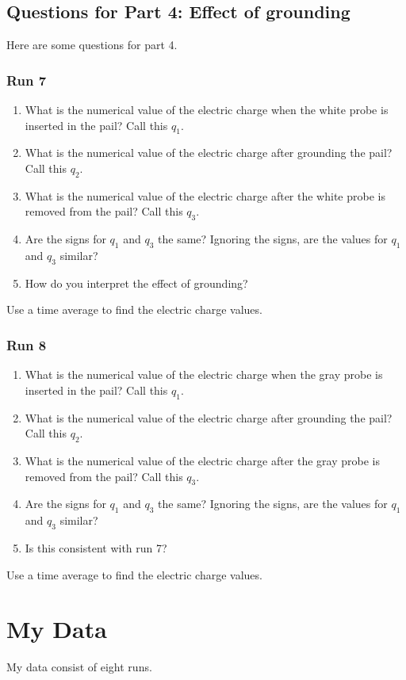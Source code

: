\subsection{Questions for Part 4: Effect of grounding}
%
Here are some questions for part 4.
%
\subsubsection{Run 7}
%
\begin{enumerate}
	\item What is the numerical value of the electric charge when the white probe is inserted in the pail? Call this $q_{1}$.
	\item What is the numerical value of the electric charge after grounding the pail? Call this $q_{2}$.
	\item What is the numerical value of the electric charge after the white probe is removed from the pail? Call this $q_{3}$.
	\item Are the signs for $q_{1}$ and $q_{3}$ the same? Ignoring the signs, are the values for $q_{1}$ and $q_{3}$ similar?
	\item How do you interpret the effect of grounding?
\end{enumerate}
Use a time average to find the electric charge values.
%
\subsubsection{Run 8}
%
\begin{enumerate}
	\item What is the numerical value of the electric charge when the gray probe is inserted in the pail? Call this $q_{1}$.
	\item What is the numerical value of the electric charge after grounding the pail? Call this $q_{2}$.
	\item What is the numerical value of the electric charge after the gray probe is removed from the pail? Call this $q_{3}$.
	\item Are the signs for $q_{1}$ and $q_{3}$ the same? Ignoring the signs, are the values for $q_{1}$ and $q_{3}$ similar?
	\item Is this consistent with run 7?
\end{enumerate}
Use a time average to find the electric charge values.
%
\section{My Data}
%
My data consist of eight runs. 
%
